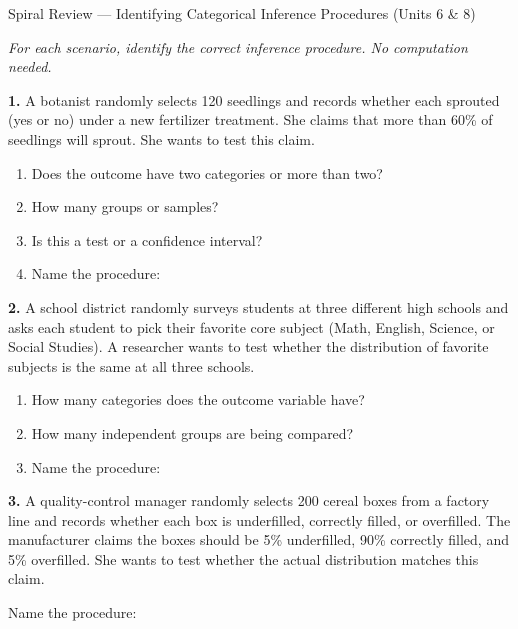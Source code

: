 \documentclass[10pt]{article}
\begin{document}
\namedateperiod

\vspace{0.12in}

\begin{notesbox}{Spiral Review --- Identifying Categorical Inference Procedures (Units 6 \& 8)}

\textit{For each scenario, identify the correct inference procedure. No computation needed.}

\vspace{0.06in}
\textbf{1.} A botanist randomly selects 120 seedlings and records whether each sprouted
(yes or no) under a new fertilizer treatment. She claims that more than 60\% of seedlings
will sprout. She wants to test this claim.

\begin{enumerate}[label=\alph*.]
  \item Does the outcome have two categories or more than two? 
  \item How many groups or samples? 
  \item Is this a test or a confidence interval? 
  \item Name the procedure: 
\end{enumerate}

\vspace{0.10in}
\textbf{2.} A school district randomly surveys students at three different high schools and
asks each student to pick their favorite core subject (Math, English, Science, or Social
Studies). A researcher wants to test whether the distribution of favorite subjects is the
same at all three schools.

\begin{enumerate}[label=\alph*.]
  \item How many categories does the outcome variable have? 
  \item How many independent groups are being compared? 
  \item Name the procedure: 
\end{enumerate}

\vspace{0.10in}
\textbf{3.} A quality-control manager randomly selects 200 cereal boxes from a factory line and
records whether each box is underfilled, correctly filled, or overfilled. The manufacturer
claims the boxes should be 5\% underfilled, 90\% correctly filled, and 5\% overfilled. She
wants to test whether the actual distribution matches this claim.

Name the procedure: 

\end{notesbox}
\end{document}
